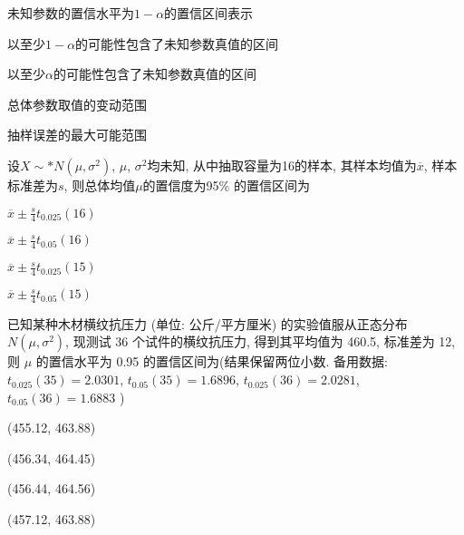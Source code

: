 \documentclass{exam-zh}
\begin{document}
\begin{question}
  未知参数的置信水平为$1-\alpha$的置信区间表示 \paren[A]
  \begin{choices}
    \item 以至少$1-\alpha$的可能性包含了未知参数真值的区间
    \item 以至少$\alpha$的可能性包含了未知参数真值的区间
    \item 总体参数取值的变动范围
    \item 抽样误差的最大可能范围
  \end{choices}
\end{question}

\begin{question}
  设$X \sim* N(\mu, \sigma^2)$, $\mu$, $\sigma^2$均未知, 从中抽取容量为16的样本, 其样本均值为$\overline{x}$, 样本标准差为$s$, 则总体均值$\mu$的置信度为95\% 的置信区间为 \paren[C]
  
  \begin{choices}
    \item $\overline{x} \pm \frac{s}{4}t_{0.025}(16)$
    \item $\overline{x} \pm \frac{s}{4}t_{0.05}(16)$
    \item $\overline{x} \pm \frac{s}{4}t_{0.025}(15)$
    \item $\overline{x} \pm \frac{s}{4}t_{0.05}(15)$
  \end{choices}
\end{question}

\begin{question}
  已知某种木材横纹抗压力 (单位: 公斤/平方厘米) 的实验值服从正态分布 $N(\mu, \sigma^2)$, 现测试 36 个试件的横纹抗压力, 		
  得到其平均值为 460.5, 标准差为 12, 则 $\mu$ 的置信水平为 0.95 的置信区间为(结果保留两位小数. 备用数据: $t_{0.025}(35) = 2.0301$, $t_{0.05}(35) = 1.6896$, $t_{0.025}(36) = 2.0281$, $t_{0.05}(36) = 1.6883$ )
  \paren[C]
  
  \begin{choices}
    \item (455.12, 463.88)
    \item (456.34, 464.45)
    \item (456.44, 464.56)
    \item (457.12, 463.88)
  \end{choices}
\end{question}
\end{document}
